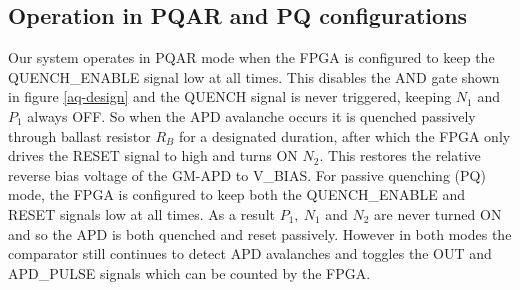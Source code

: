 \subsection{Operation in PQAR and PQ configurations}
Our system operates in PQAR mode when the FPGA is configured to keep the QUENCH\_ENABLE signal low at all times. This disables the AND gate shown in figure \ref{aq-design} and the QUENCH signal is never triggered, keeping $N_1$ and $P_1$ always OFF. So when the APD avalanche occurs it is quenched passively through ballast resistor $R_B$ for a designated duration, after which the FPGA only drives the RESET signal to high and turns ON $N_2$. This restores the relative reverse bias voltage of the GM-APD to V\_BIAS. For passive quenching (PQ) mode, the FPGA is configured to keep both the QUENCH\_ENABLE and RESET signals low at all times. As a result $P_1,\ N_1$ and $N_2$ are never turned ON and so the APD is both quenched and reset passively. However in both modes the comparator still continues to detect APD avalanches and toggles the OUT and APD\_PULSE signals which can be counted by the FPGA.